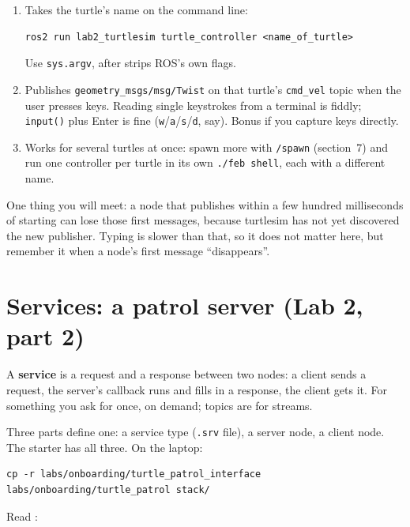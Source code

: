 \documentclass[11pt,a4paper]{article}
\begin{document}
\begin{enumerate}
  \item Takes the turtle's name on the command line:
\begin{lstlisting}
ros2 run lab2_turtlesim turtle_controller <name_of_turtle>
\end{lstlisting}
  Use \texttt{sys.argv}, after  strips ROS's
  own flags.
  \item Publishes \texttt{geometry\_msgs/msg/Twist} on that turtle's \texttt{cmd\_vel} topic when
  the user presses keys. Reading single keystrokes from a terminal is fiddly; \texttt{input()}
  plus Enter is fine (\texttt{w}/\texttt{a}/\texttt{s}/\texttt{d}, say). Bonus if you capture
  keys directly.
  \item Works for several turtles at once: spawn more with \texttt{/spawn} (section~7) and run one
  controller per turtle in its own \texttt{./feb shell}, each with a different name.
\end{enumerate}

One thing you will meet: a node that publishes within a few hundred milliseconds of starting
can lose those first messages, because turtlesim has not yet discovered the new publisher.
Typing is slower than that, so it does not matter here, but remember it when a node's first
message ``disappears''.


\section{Services: a patrol server (Lab 2, part 2)}

A \textbf{service} is a request and a response between two nodes: a client sends a request, the
server's callback runs and fills in a response, the client gets it. For something you ask for
once, on demand; topics are for streams.

Three parts define one: a service type (\texttt{.srv} file), a server node, a client node. The
starter has all three. On the laptop:

\begin{lstlisting}
cp -r labs/onboarding/turtle_patrol_interface labs/onboarding/turtle_patrol stack/
\end{lstlisting}

Read :
\end{document}
